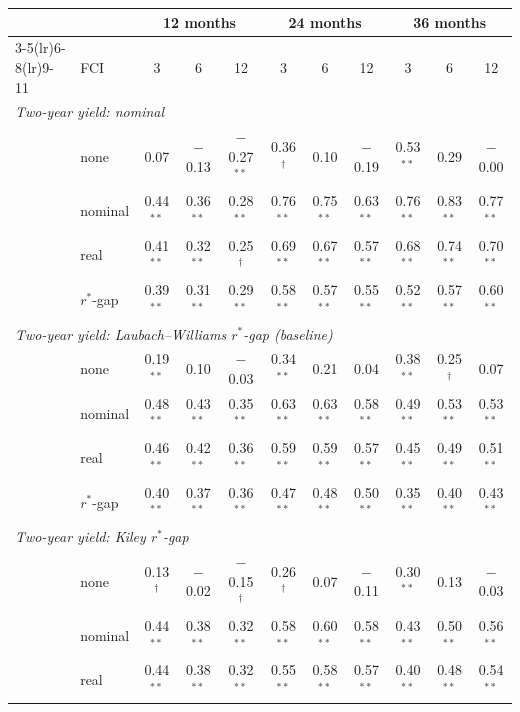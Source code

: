 \begin{tabular}{llccccccccc}
\toprule
 & & \multicolumn{3}{c}{12 months} & \multicolumn{3}{c}{24 months} & \multicolumn{3}{c}{36 months}\\
\cmidrule(lr){3-5}\cmidrule(lr){6-8}\cmidrule(lr){9-11}
 & FCI & 3 & 6 & 12 & 3 & 6 & 12 & 3 & 6 & 12 \\
\midrule
\multicolumn{11}{l}{\textit{Two-year yield: nominal}}\\
 & none & 0.07 & $-$0.13 & $-$0.27$^{**}$ & 0.36$^{\dagger}$ & 0.10 & $-$0.19 & 0.53$^{**}$ & 0.29 & $-$0.00 \\
 & nominal & 0.44$^{**}$ & 0.36$^{**}$ & 0.28$^{**}$ & 0.76$^{**}$ & 0.75$^{**}$ & 0.63$^{**}$ & 0.76$^{**}$ & 0.83$^{**}$ & 0.77$^{**}$ \\
 & real & 0.41$^{**}$ & 0.32$^{**}$ & 0.25$^{\dagger}$ & 0.69$^{**}$ & 0.67$^{**}$ & 0.57$^{**}$ & 0.68$^{**}$ & 0.74$^{**}$ & 0.70$^{**}$ \\
 & $r^*$-gap & 0.39$^{**}$ & 0.31$^{**}$ & 0.29$^{**}$ & 0.58$^{**}$ & 0.57$^{**}$ & 0.55$^{**}$ & 0.52$^{**}$ & 0.57$^{**}$ & 0.60$^{**}$ \\
\midrule
\multicolumn{11}{l}{\textit{Two-year yield: Laubach--Williams $r^*$-gap (baseline)}}\\
 & none & 0.19$^{**}$ & 0.10 & $-$0.03 & 0.34$^{**}$ & 0.21 & 0.04 & 0.38$^{**}$ & 0.25$^{\dagger}$ & 0.07 \\
 & nominal & 0.48$^{**}$ & 0.43$^{**}$ & 0.35$^{**}$ & 0.63$^{**}$ & 0.63$^{**}$ & 0.58$^{**}$ & 0.49$^{**}$ & 0.53$^{**}$ & 0.53$^{**}$ \\
 & real & 0.46$^{**}$ & 0.42$^{**}$ & 0.36$^{**}$ & 0.59$^{**}$ & 0.59$^{**}$ & 0.57$^{**}$ & 0.45$^{**}$ & 0.49$^{**}$ & 0.51$^{**}$ \\
 & $r^*$-gap & 0.40$^{**}$ & 0.37$^{**}$ & 0.36$^{**}$ & 0.47$^{**}$ & 0.48$^{**}$ & 0.50$^{**}$ & 0.35$^{**}$ & 0.40$^{**}$ & 0.43$^{**}$ \\
\midrule
\multicolumn{11}{l}{\textit{Two-year yield: Kiley $r^*$-gap}}\\
 & none & 0.13$^{\dagger}$ & $-$0.02 & $-$0.15$^{\dagger}$ & 0.26$^{\dagger}$ & 0.07 & $-$0.11 & 0.30$^{**}$ & 0.13 & $-$0.03 \\
 & nominal & 0.44$^{**}$ & 0.38$^{**}$ & 0.32$^{**}$ & 0.58$^{**}$ & 0.60$^{**}$ & 0.58$^{**}$ & 0.43$^{**}$ & 0.50$^{**}$ & 0.56$^{**}$ \\
 & real & 0.44$^{**}$ & 0.38$^{**}$ & 0.32$^{**}$ & 0.55$^{**}$ & 0.58$^{**}$ & 0.57$^{**}$ & 0.40$^{**}$ & 0.48$^{**}$ & 0.54$^{**}$ \\

\end{tabular}
